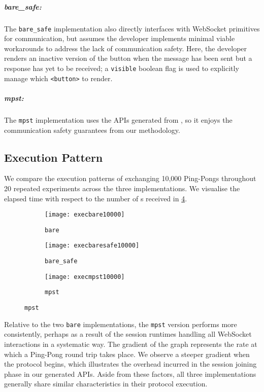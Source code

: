 \subparagraph{bare_safe:}
The \texttt{bare_safe} implementation also directly interfaces with
WebSocket primitives for communication, but assumes the developer
implements minimal viable workarounds to address the lack of
communication safety. Here, the developer renders an inactive version
of the  button when the  message has been sent
but a response has yet to be received; a \texttt{visible} boolean flag
is used to explicitly manage which \texttt{<button>} to render.

\subparagraph{mpst:}
The \texttt{mpst} implementation uses the APIs generated from 
, so it enjoys the
communication safety guarantees from our methodology.

\subsection{Execution Pattern}
\label{section:execpattern}

We compare the execution patterns of exchanging 10,000 Ping-Pongs
throughout 20 repeated experiments across the three implementations.
We visualise the elapsed time with respect to the number of s
received in \cref{fig:execution}.

\begin{figure}[!ht]
\centering
\begin{subfigure}[b]{0.3\textwidth}
\centering
\texttt{[image: execbare10000]}
\caption{\texttt{bare}}
\label{fig:executionbare}
\end{subfigure}
\hfill
\begin{subfigure}[b]{0.3\textwidth}
\centering
\texttt{[image: execbaresafe10000]}
\caption{\texttt{bare_safe}}
\label{fig:executionbaresafe}
\end{subfigure}
\hfill
\begin{subfigure}[b]{0.3\textwidth}
\centering
\texttt{[image: execmpst10000]}
\caption{\texttt{mpst}}
\label{fig:executionmpst}
\end{subfigure}
\label{fig:execution}
\end{figure}

Relative to the two \texttt{bare} implementations, the
\texttt{mpst} version performs more consistently, perhaps as a result
of the session runtimes handling all WebSocket interactions in a
systematic way. The gradient of the graph represents the rate at which
a Ping-Pong round trip takes place. 
We observe a steeper gradient when the protocol begins, 
which illustrates the overhead incurred in the 
session joining phase in our generated APIs.
Aside from these factors, all three implementations generally share
similar characteristics in their protocol execution.

